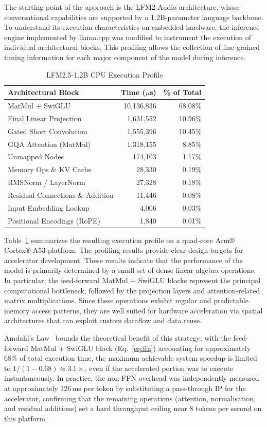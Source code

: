 \documentclass[manuscript,]{acmart} %
\begin{document}
The starting point of the approach is the LFM2-Audio architecture, whose conversational capabilities are supported by a 1.2B-parameter language backbone. To understand its execution characteristics on embedded hardware, the inference engine implemented by llama.cpp was modified to instrument the execution of individual architectural blocks. This profiling allows the collection of fine-grained timing information for each major component of the model during inference.
\begin{table}[htbp]
\centering
\caption{LFM2.5-1.2B CPU Execution Profile}
\label{tab:cpu_profile}
\begin{tabular}{lrr}
\hline
\textbf{Architectural Block} & \textbf{Time ($\mu$s)} & \textbf{\% of Total} \\ \hline
MatMul + SwiGLU & 10,136,836 & 68.08\% \\
Final Linear Projection & 1,631,552 & 10.96\% \\
Gated Short Convolution & 1,555,396 & 10.45\% \\
GQA Attention (MatMul) & 1,318,155 & 8.85\% \\
Unmapped Nodes & 174,103 & 1.17\% \\
Memory Ops \& KV Cache & 28,330 & 0.19\% \\
RMSNorm / LayerNorm & 27,328 & 0.18\% \\
Residual Connections \& Addition & 11,446 & 0.08\% \\
Input Embedding Lookup & 4,006 & 0.03\% \\
Positional Encodings (RoPE) & 1,840 & 0.01\% \\ \hline
\end{tabular}
\end{table}

Table~\ref{tab:cpu_profile} summarizes the resulting execution profile on a quad-core Arm® Cortex®-A53 platform. The profiling results provide clear design targets for accelerator development.
These results indicate that the performance of the model is primarily determined by a small set of dense linear algebra operations. In particular, the feed-forward MatMul + SwiGLU blocks represent the principal computational bottleneck, followed by the projection layers and attention-related matrix multiplications. Since these operations exhibit regular and predictable memory access patterns, they are well suited for hardware acceleration via spatial architectures that can exploit custom dataflow and data reuse.

Amdahl's Law~\cite{Amdahl1967ValidityOT} bounds the theoretical benefit of this strategy: with the feed-forward
MatMul + SwiGLU block (Eq.~\eqref{eq:ffn}) accounting for approximately 68\% of total execution time, the
maximum achievable system speedup is limited to $1/(1-0.68) \approx 3.1\times$,
even if the accelerated portion was to execute instantaneously. In practice, the
non-FFN overhead was independently measured at approximately 126\,ms per token
by substituting a pass-through IP for the accelerator, confirming that the
remaining operations (attention, normalisation, and residual additions) set a hard
throughput ceiling near 8 tokens per second on this platform.
\end{document}

